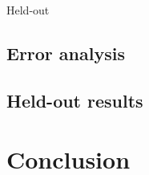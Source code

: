 \documentclass[11pt,letterpaper]{article}
\begin{document}




Held-out

\subsection{Error analysis}

\subsection{Held-out results}

\section{Conclusion}
\label{sec:disc}



\end{document}
